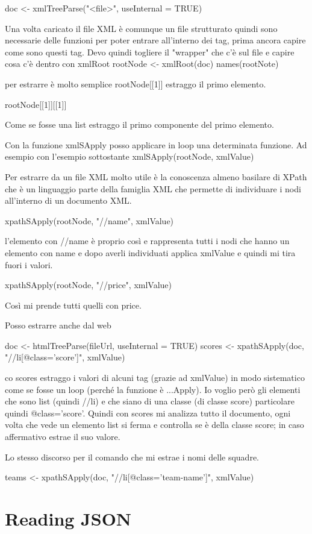 doc <- xmlTreeParse("<file>", useInternal = TRUE)

Una volta caricato il file XML è comunque un file strutturato quindi sono necessarie delle funzioni per poter entrare all'interno dei tag, prima ancora capire come sono questi tag.
Devo quindi togliere il "wrapper" che c'è sul file e capire cosa c'è dentro con xmlRoot
rootNode <- xmlRoot(doc)
names(rootNote)

per estrarre è molto semplice rootNode[[1]] estraggo il primo elemento.

rootNode[[1]][[1]]

Come se fosse una list estraggo il primo componente del primo elemento.

Con la funzione xmlSApply posso applicare in loop una determinata funzione.
Ad esempio con l'esempio sottostante
xmlSApply(rootNode, xmlValue)

Per estrarre da un file XML molto utile è la conoscenza almeno basilare di XPath che è un linguaggio parte della famiglia XML che permette di individuare i nodi all'interno di un documento XML.

xpathSApply(rootNode, "//name", xmlValue)

l'elemento con //name è proprio così e rappresenta tutti i nodi che hanno un elemento con name e dopo averli individuati applica xmlValue e quindi mi tira fuori i valori.

xpathSApply(rootNode, "//price", xmlValue)

Così mi prende tutti quelli con price.

Posso estrarre anche dal web

doc <- htmlTreeParse(fileUrl, useInternal = TRUE)
scores <- xpathSApply(doc, "//li[@class='score']", xmlValue)

co scores estraggo i valori di alcuni tag (grazie ad xmlValue) in modo sistematico come se fosse un loop (perché la funzione è ...Apply).
Io voglio però gli elementi che sono list (quindi //li) e che siano di una classe (di classe score) particolare quindi @class='score'.
Quindi con scores mi analizza tutto il documento, ogni volta che vede un elemento list si ferma e controlla se è della classe score; in caso affermativo estrae il suo valore.

Lo stesso discorso per il comando che mi estrae i nomi delle squadre.

teams <- xpathSApply(doc, "//li[@class='team-name']", xmlValue)



\section{Reading JSON}


